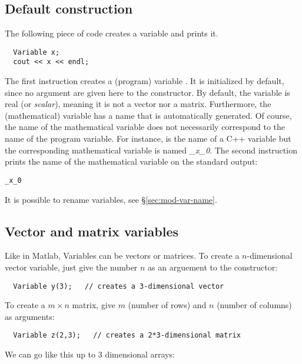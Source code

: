 \subsection{Default construction}

The following piece of code creates a variable  and prints it.

\begin{lstlisting}
  Variable x;
  cout << x << endl;
\end{lstlisting}

The first instruction creates a (program) variable . It is initialized by default, since
no argument are given here to the constructor.
By default, the variable is real (or {\it scalar}), meaning it is not a vector nor a matrix. 
Furthermore, the (mathematical) variable has a name that is automatically
generated. Of course, the name of the mathematical variable does not necessarily correspond to the name of the 
program variable.
For instance,  is the name of a C++ variable but the corresponding 
mathematical variable is named {\it \_x\_0}.
The second instruction prints the name of the mathematical variable on the standard output:

\begin{lstlisting}
_x_0
\end{lstlisting}

It is possible to rename variables, see \S\ref{sec:mod-var-name}.

\subsection{Vector and matrix variables}\label{sec:mod-var-vec}

Like in Matlab, Variables can be vectors or matrices. To create a $n$-dimensional vector variable, just
give the number $n$ as an arguement to the constructor:

\begin{lstlisting}
  Variable y(3);   // creates a 3-dimensional vector
\end{lstlisting}

To create a $m\times n$ matrix, give $m$ (number of rows) and $n$ (number of columns) as arguments:

\begin{lstlisting}
  Variable z(2,3);   // creates a 2*3-dimensional matrix
\end{lstlisting}

We can go like this up to 3 dimensional arrays:

